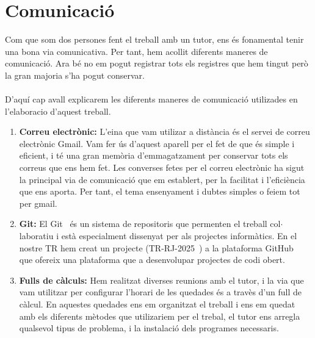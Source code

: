  \section{Comunicació} \label{sec:4.1}
 Com que som dos persones fent el treball amb un tutor, ens és fonamental tenir una bona via comunicativa. Per tant, hem acollit diferents maneres de comunicació. Ara bé no em pogut registrar tots els registres que hem tingut però la gran majoria s'ha pogut conservar.\\ \\
 D'aquí cap avall explicarem les diferents maneres de comunicació utilizades en l'elaboracio d'aquest treball.\\
    \begin{enumerate}
     \item \textbf{Correu electrònic:} L'eina que vam utilizar a distància és el servei de correu electrònic Gmail. Vam fer ús d'aquest aparell per el fet de que és simple i eficient, i té una gran memòria d'emmagatzament per conservar tots els correus que ens hem fet.
     Les converses fetes per el correu electrònic ha sigut la principal via de comunicació que em establert, per la facilitat i l'eficiència que ens aporta. Per tant, el tema ensenyament i dubtes simples o feiem tot per gmail.
      \item \textbf{Git:} El Git~\cite{git} és un sistema de repositoris que permenten el treball col$\cdot$laboratiu i està especialment dissenyat per als projectes informàtics. En el nostre TR hem creat un projecte (TR-RJ-2025~\cite{TR-RJ-2025}) a
      la plataforma GitHub~\cite{GitHub} que ofereix una plataforma que a desenvolupar projectes de codi obert.
      \item \textbf{Fulls de càlculs:} Hem realitzat diverses reunions amb el tutor, i la via que vam utilitzar per configurar l'horari de les quedades és a travès d'un full de càlcul. En aquestes quedades ens em organitzat el treball i ens em quedat amb els diferents mètodes que utilizariem per el trebal, el tutor ens arregla qualsevol tipus de problema, i la instalació dels programes necessaris.
    \end{enumerate}


